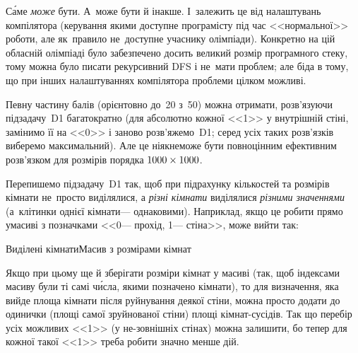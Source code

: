 С\'{а}ме \emph{може} бути. А~може бути й інакше. І~залежить це від налаштувань компілятора (керування якими доступне програмісту під час <<нормальної>> роботи, але як~правило не~доступне учаснику олімпіади). Конкретно на цій обласній олімпіаді було забезпечено досить великий розмір програмного стеку, тому можна було писати рекурсивний DFS і не~мати проблем; але біда в тому, що при інших налаштуваннях компілятора проблеми цілком можливі.







Певну частину балів (орієнтовно до~20 з~50) можна отримати, розв’язуючи підзадачу~D1 багатократно (для абсолютно кожної <<1>> у внутрішній стіні, замінимо її на <<0>> і заново розв’яжемо~D1; серед усіх таких розв’язків виберемо максимальний). Але це ніяк\nolinebreak[2] не\nolinebreak[3] може бути повноцінним ефективним розв’язком для розмірів порядка $1000\times1000$.

Перепишемо підзадачу~D1 так, щоб при підрахунку кількостей та розмірів кімнати не~просто виділялися, а \emph{різні кімнати} виділялися \emph{різними значеннями} (а~клітинки однієї кімнати\nolinebreak[3] --- однаковими). Наприклад, якщо це робити прямо у\nolinebreak[3] масиві з позначками <<0\nolinebreak[3] --- прохід, 1\nolinebreak[3] --- стіна>>, може вийти так:

\noindent\begin{minipage}{\textwidth}
\begin{exampleSimpleThreeWithSpecNameColTwo}{6em}{12em}{13em}{Виділені кімнати}{Масив з розмірами кімнат}%
%
\end{exampleSimpleThreeWithSpecNameColTwo}
\end{minipage}

Якщо при цьому ще й зберігати розміри кімнат у масиві (так, щоб індексами масиву були ті самі ч\'{и}сла, якими позначено кімнати), то для визначення, яка вийде площа кімнати після руйнування деякої стіни, можна просто додати до одинички (площі самої зруйнованої стіни) площі кімнат-сусідів. Так що перебір усіх можливих <<1>> (у не-зовнішніх стінах) можна залишити, бо тепер для кожної такої <<1>> треба робити значно менше дій.

